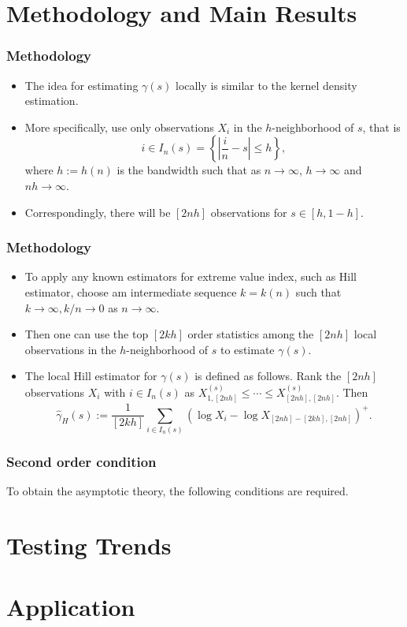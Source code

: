 \documentclass{beamer}
\newcommand{\abs}[1]{\left\vert#1\right\vert}
\newcommand{\set}[1]{\left\{#1\right\}}
\begin{document}
\section{Methodology and Main Results}

\begin{frame}
    \frametitle{Methodology}
\begin{itemize}
    \item The idea for estimating $\gamma(s)$ locally is similar to the kernel density estimation.
    \medskip
    \item More specifically, use only observations $X_i$ in the $h$-neighborhood of $s$, that is 
    $$
i\in I_n(s)=\set{\abs{\frac{i}{n}-s}\le h},
    $$
    where $h:=h(n)$ is the bandwidth such that as $n\to \infty$, $h \to \infty$ and $nh\to \infty$.
    \medskip
\item Correspondingly, there will be $[2nh]$ observations for $s\in [h,1-h]$.
\end{itemize}
\end{frame}

\begin{frame}
    \frametitle{Methodology}
\begin{itemize}
    \item To apply any known estimators for extreme value index, such as Hill estimator, choose am intermediate sequence $k=k(n)$ such that $k\to \infty, k/n \to 0$ as $n \to \infty$.
    \item Then one can use the top $[2kh]$ order statistics among the $[2nh]$ local observations in the $h$-neighborhood of $s$ to estimate $\gamma(s)$.
    \item The local Hill estimator for $\gamma(s)$ is defined as follows. Rank the $[2nh]$ observations $X_i$ with $i \in I_n(s)$ as $X_{1,[2nh]}^{(s)}\le \cdots \le X_{[2nh],[2nh]}^{(s)}$. Then
    $$
    \hat{\gamma}_{H}(s):=\frac{1}{[2 k h]} \sum_{i \in I_{n}(s)}\left(\log X_{i}-\log X_{[2 n h]-[2 k h],[2 n h]}\right)^{+}.
    $$
\end{itemize}
\end{frame}






\begin{frame}
    \frametitle{Second order condition}
To obtain the asymptotic theory, the following conditions are required.
    

\end{frame}

\section{Testing Trends}

\section{Application}
\end{document}
